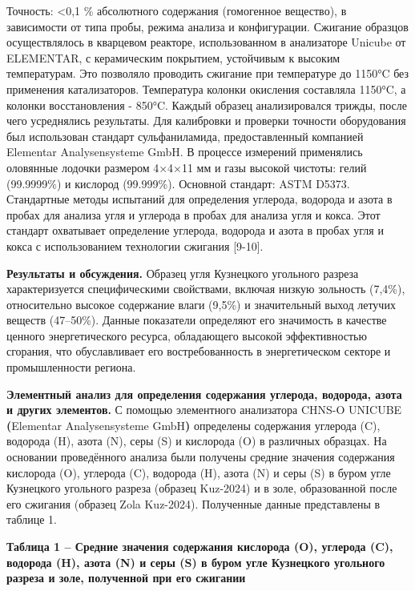 Точность: \textless0,1 \% абсолютного содержания (гомогенное вещество),
в зависимости от типа пробы, режима анализа и конфигурации. Сжигание
образцов осуществлялось в кварцевом реакторе, использованном в
анализаторе Unicube от ELEMENTAR, с керамическим покрытием, устойчивым к
высоким температурам. Это позволяло проводить сжигание при температуре
до 1150°C без применения катализаторов. Температура колонки окисления
составляла 1150°C, а колонки восстановления - 850°C. Каждый образец
анализировался трижды, после чего усреднялись результаты. Для калибровки
и проверки точности оборудования был использован стандарт
сульфаниламида, предоставленный компанией Elementar Analysensysteme
GmbH. В процессе измерений применялись оловянные лодочки размером 4×4×11
мм и газы высокой чистоты: гелий (99.9999\%) и кислород (99.999\%).
Основной стандарт: ASTM D5373. Стандартные методы испытаний для
определения углерода, водорода и азота в пробах для анализа угля и
углерода в пробах для анализа угля и кокса. Этот стандарт охватывает
определение углерода, водорода и азота в пробах угля и кокса с
использованием технологии сжигания {[}9-10{]}.

{\bfseries Результаты и обсуждения.} Образец угля Кузнецкого угольного
разреза характеризуется специфическими свойствами, включая низкую
зольность (7,4\%), относительно высокое содержание влаги (9,5\%) и
значительный выход летучих веществ (47--50\%). Данные показатели
определяют его значимость в качестве ценного энергетического ресурса,
обладающего высокой эффективностью сгорания, что обуславливает его
востребованность в энергетическом секторе и промышленности региона.

{\bfseries Элементный анализ для определения содержания углерода, водорода,
азота и других элементов.} С помощью элементного анализатора CHNS-O
UNICUBE {\bfseries (}Elementar Analysensysteme GmbH{\bfseries )} определены
содержания углерода (C), водорода (H), азота (N), серы (S) и кислорода
(O) в различных образцах. На основании проведённого анализа были
получены средние значения содержания кислорода (O), углерода (C),
водорода (H), азота (N) и серы (S) в буром угле Кузнецкого угольного
разреза (образец Kuz-2024) и в золе, образованной после его сжигания
(образец Zola Kuz-2024). Полученные данные представлены в таблице 1.

{\bfseries Таблица 1 -- Средние значения содержания кислорода (O), углерода
(C), водорода (H), азота (N) и серы (S) в буром угле Кузнецкого
угольного разреза и золе, полученной при его сжигании}


